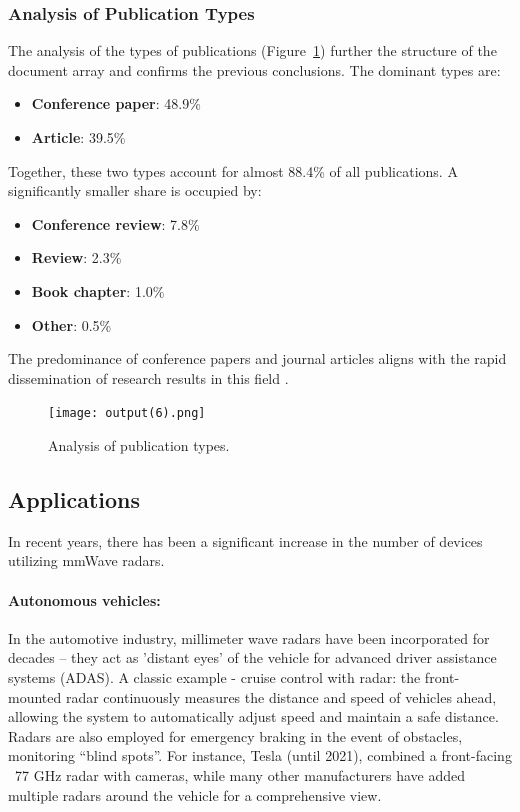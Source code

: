 \subsubsection*{Analysis of Publication Types}
The analysis of the types of publications (Figure~\ref{fig:output6_png}) further  the structure of the document array and confirms the previous conclusions. The dominant types are:
\begin{itemize}
    \item \textbf{Conference paper}: 48.9\%
    \item \textbf{Article}: 39.5\%
\end{itemize}
Together, these two types account for almost 88.4\% of all publications. A significantly smaller share is occupied by:
\begin{itemize}
    \item \textbf{Conference review}: 7.8\%
    \item \textbf{Review}: 2.3\%
    \item \textbf{Book chapter}: 1.0\%
    \item \textbf{Other}: 0.5\%
\end{itemize}
The predominance of conference papers and journal articles aligns with the rapid dissemination of research results in this field \citep{Thrun2005}.

\begin{figure}[H]
\centering
\texttt{[image: output(6).png]}
\caption{Analysis of publication types.}
\label{fig:output6_png}
\end{figure}

\subsection{Applications}


\noindent
In recent years, there has been a significant increase in the number of devices utilizing mmWave radars. 

\paragraph{Autonomous vehicles:}
In the automotive industry, millimeter wave radars have been incorporated for decades – they act as 'distant eyes' of the vehicle for advanced driver assistance systems (ADAS). A classic example - cruise control with radar: the front-mounted radar continuously measures the distance and speed of vehicles ahead, allowing the system to automatically adjust speed and maintain a safe distance. Radars are also employed for emergency braking in the event of obstacles, monitoring “blind spots”. For instance, Tesla (until 2021), combined a front-facing ~77 GHz radar with cameras, while many other manufacturers have added multiple radars around the vehicle for a comprehensive view. 
